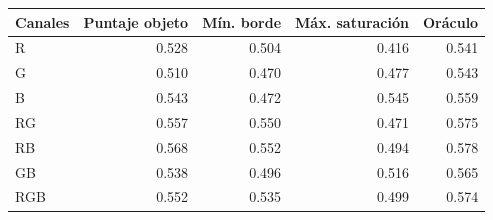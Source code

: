 \footnotesize
\begin{tabular}{lrrrr}
\toprule
Canales & Puntaje objeto & Mín. borde & Máx. saturación & Oráculo \\
\midrule
R & 0.528 & 0.504 & 0.416 & 0.541 \\
G & 0.510 & 0.470 & 0.477 & 0.543 \\
B & 0.543 & 0.472 & 0.545 & 0.559 \\
RG & 0.557 & 0.550 & 0.471 & 0.575 \\
RB & 0.568 & 0.552 & 0.494 & 0.578 \\
GB & 0.538 & 0.496 & 0.516 & 0.565 \\
RGB & 0.552 & 0.535 & 0.499 & 0.574 \\
\bottomrule
\end{tabular}
